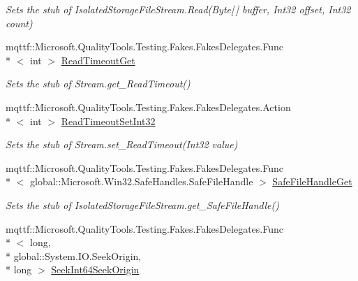 \begin{DoxyCompactItemize}
\begin{DoxyCompactList}\small\item\em Sets the stub of Isolated\-Storage\-File\-Stream.\-Read(\-Byte\mbox{[}$\,$\mbox{]} buffer, Int32 offset, Int32 count)\end{DoxyCompactList}\item 
mqttf\-::\-Microsoft.\-Quality\-Tools.\-Testing.\-Fakes.\-Fakes\-Delegates.\-Func\\*
$<$ int $>$ \hyperlink{class_system_1_1_i_o_1_1_isolated_storage_1_1_fakes_1_1_stub_isolated_storage_file_stream_af9d18707fef53a1c382ce7f635f6d0fe}{Read\-Timeout\-Get}
\begin{DoxyCompactList}\small\item\em Sets the stub of Stream.\-get\-\_\-\-Read\-Timeout()\end{DoxyCompactList}\item 
mqttf\-::\-Microsoft.\-Quality\-Tools.\-Testing.\-Fakes.\-Fakes\-Delegates.\-Action\\*
$<$ int $>$ \hyperlink{class_system_1_1_i_o_1_1_isolated_storage_1_1_fakes_1_1_stub_isolated_storage_file_stream_a8fc33b6a36340e91ad4248aeb70a1fad}{Read\-Timeout\-Set\-Int32}
\begin{DoxyCompactList}\small\item\em Sets the stub of Stream.\-set\-\_\-\-Read\-Timeout(\-Int32 value)\end{DoxyCompactList}\item 
mqttf\-::\-Microsoft.\-Quality\-Tools.\-Testing.\-Fakes.\-Fakes\-Delegates.\-Func\\*
$<$ global\-::\-Microsoft.\-Win32.\-Safe\-Handles.\-Safe\-File\-Handle $>$ \hyperlink{class_system_1_1_i_o_1_1_isolated_storage_1_1_fakes_1_1_stub_isolated_storage_file_stream_abf84a6a0d016b8adba63183cb6145c79}{Safe\-File\-Handle\-Get}
\begin{DoxyCompactList}\small\item\em Sets the stub of Isolated\-Storage\-File\-Stream.\-get\-\_\-\-Safe\-File\-Handle()\end{DoxyCompactList}\item 
mqttf\-::\-Microsoft.\-Quality\-Tools.\-Testing.\-Fakes.\-Fakes\-Delegates.\-Func\\*
$<$ long, \\*
global\-::\-System.\-I\-O.\-Seek\-Origin, \\*
long $>$ \hyperlink{class_system_1_1_i_o_1_1_isolated_storage_1_1_fakes_1_1_stub_isolated_storage_file_stream_a2c7eb15d4d844cb8633689d63597a4e2}{Seek\-Int64\-Seek\-Origin}

\end{DoxyCompactItemize}
